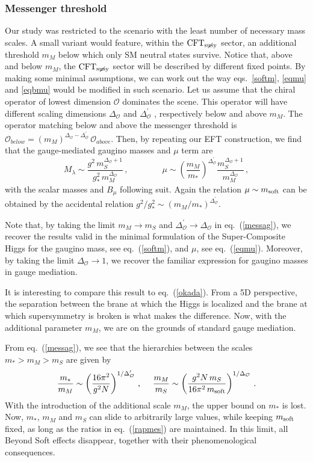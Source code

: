 \documentclass[a4paper,12pt]{article}
\newcommand{\beq}{\begin{equation}}
\newcommand{\eeq}{\end{equation}}
\def\eq#1{eq.~(\ref{#1})}
\def\eq#1{eq.~(\ref{#1})}
\def\O{\mathcal{O}}
\def\mst{m_*}
\def\mS{m_S}
\def\msoft{m_{\rm soft}}
\def\CFTs{{\rm CFT}_ {{\rm susy}\! \! \! \! \! \! \! \!\diagup \,\,\,}}
\begin{document}
{{{{\subsubsection*{Messenger threshold}

Our study was restricted to the scenario with the least number of necessary mass scales.
A small variant would feature,  within the $\CFTs$ sector, an additional threshold $m_M$
below which only SM neutral states survive. Notice that, above and below $m_M$, the $\CFTs$ sector will be described by different fixed points. By making some minimal assumptions, we can work out the way eqs.~\eqref{softm}, \eqref{eqmu} and \eqref{eqbmu} would be modified in such scenario.
Let us assume that the chiral operator
of lowest dimension $\O$ dominates the scene. This operator will have different scaling dimensions $\Delta_{\O}$ and $\Delta_{\O}^\prime$ , respectively below and above $m_M$. The operator matching below and above the messenger threshold is
$\O_{below}=(m_M)^{\Delta_{\O}-\Delta_{\O}^\prime}\,\O_{above} $. Then, by repeating our EFT construction, we find that the gauge-mediated gaugino masses and $\mu$ term are
\beq
M_{\lambda}\sim \frac{g^2\, m_S^{\Delta_{\O}+1}}{g_*^2\, m_M^{\Delta_{\O}}}\,,\qquad\qquad \mu \sim \left(\frac{m_M}{\mst}\right )^{\Delta_{\O}^\prime}
\frac{m_S^{\Delta_{\O}+1}}{m_M^{\Delta_{\O}}} \, ,
\label{messag}
\eeq
with the scalar masses and $B_\mu$ following suit. Again the relation  $\mu \sim \msoft $ can be obtained by the accidental
relation $g^2/g_*^2\sim (m_M/m_*)^{\Delta_{\O}^\prime}$.

Note that, by taking the limit $m_M\to \mS$ and $\Delta_{\O}^\prime \to \Delta_{\O}$ in \eq{messag}, we recover the results valid in the minimal formulation of the Super-Composite Higgs for the gaugino mass, see \eq{softm}, and $\mu$, see \eq{eqmu}. Moreover, by taking the limit $\Delta_{\O}\to 1$, we recover the familiar expression for gaugino masses in gauge mediation.

It is interesting to
compare this result to \eq{okada}. From a 5D perspective, the separation between the brane at which the Higgs is localized and the brane at which supersymmetry is broken is what makes the difference. Now, with the additional parameter $m_M$, we are on the grounds of standard gauge mediation. 

From \eq{messag}, we see that the hierarchies between the scales $\mst > m_M>\mS$ are given by
\beq
\frac{\mst}{m_M}\sim \left( \frac{16\pi^2}{g^2N}\right)^{1/\Delta_{\O}^\prime}\, ,~~~~
\frac{m_M}{\mS}\sim \left( \frac{g^2N\, \mS}{16\pi^2\, \msoft}\right)^{1/\Delta_{\O}}\, .
\label{rapmes}
\eeq
With the introduction of the additional scale $m_M$, the upper bound on $\mst$ is lost. Now, $\mst$, $m_M$ and $\mS$ can slide to arbitrarily large values, while keeping $\msoft$ fixed, as long as the ratios in \eq{rapmes} are maintained. In this limit, all Beyond Soft effects disappear, together with their phenomenological consequences. 

}}}}
\end{document}
